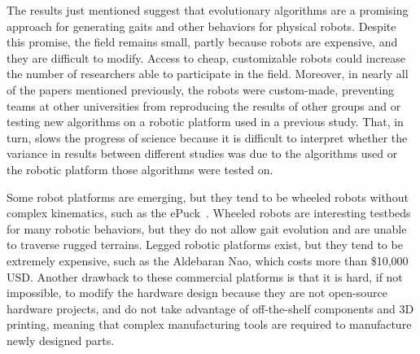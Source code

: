 \documentclass[letterpaper]{article}
\begin{document}


The results just mentioned suggest that evolutionary algorithms are a promising approach for generating gaits and other behaviors for physical robots. Despite this promise, the field remains small, partly because robots are expensive, and they are difficult to modify. Access to cheap, customizable robots could increase the number of researchers able to participate in the field. Moreover, in nearly all of the papers mentioned previously, the robots were custom-made, preventing teams at other universities from reproducing the results of other groups and or testing new algorithms on a robotic platform used in a previous study. That, in turn, slows the progress of science because it is difficult to interpret whether the variance in results between different studies was due to the algorithms used or the robotic platform those algorithms were tested on.  

Some robot platforms are emerging, but they tend to be wheeled robots without complex kinematics, such as the ePuck~\citep{mondada2009puck}. Wheeled robots are interesting testbeds for many robotic behaviors, but they do not allow gait evolution and are unable to traverse rugged terrains. Legged robotic platforms exist, but they tend to be extremely expensive, such as the Aldebaran Nao, which costs more than \$10,000 USD. Another drawback to these commercial platforms is that it is hard, if not impossible, to modify the hardware design because they are not open-source hardware projects, and do not take advantage of off-the-shelf components and 3D printing, meaning that complex manufacturing tools are required to manufacture newly designed parts. 
\end{document}
